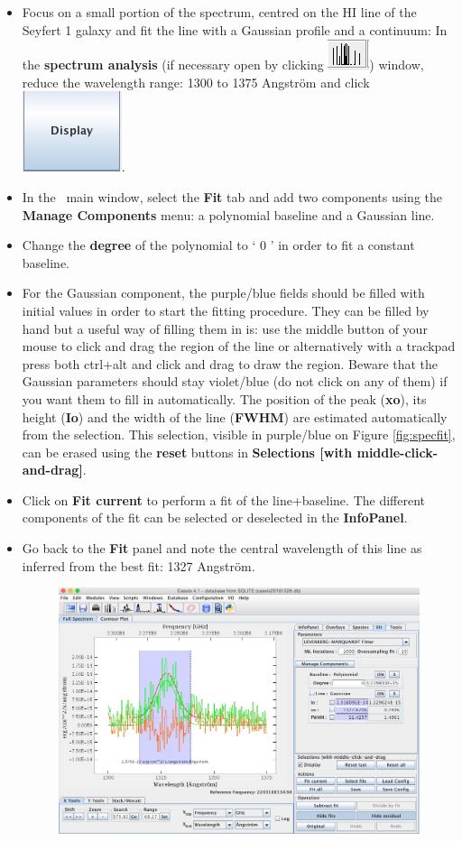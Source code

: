 \documentclass [a4paper, 12pt]{article}
\begin{document}
\begin{itemize}
\item Focus on a small portion of the spectrum, centred on the HI line of the
Seyfert 1 galaxy and fit the line with a Gaussian profile and a continuum: In
the \textbf{spectrum analysis} (if necessary open by clicking
\includegraphics[width=0.05
\textwidth]{../images/cassis_button_spec-analysis.jpg}) window, reduce the
wavelength range:
1300 to 1375 Angstr\"om and click \includegraphics[width=0.05
\textwidth]{../images/cassis_button_display.jpg}.
\item In the \cassis\ main window, select the \textbf{Fit} tab and add two
components using the \textbf{Manage Components} menu: a polynomial baseline and
a Gaussian line.
\item Change the \textbf{degree} of the polynomial to ` 0 ' in order to fit a constant baseline.
\item For the Gaussian component, the purple/blue fields should be filled with
initial values in order to start the fitting procedure. They can be filled by
hand but a useful way of filling them in is: use the middle button of your
mouse to click and drag the region of the line or alternatively with a trackpad
press both ctrl+alt and click and drag to draw the region. Beware that the
Gaussian parameters should stay violet/blue (do not click on any of them) if
you want them to fill in automatically. The position of the peak (\textbf{xo}),
its height (\textbf{Io}) and the width of the line (\textbf{FWHM}) are
estimated automatically from the selection. This selection, visible in
purple/blue on Figure \ref{fig:specfit}, can be erased using the \textbf{reset}
buttons in \textbf{Selections [with middle-click-and-drag]}.
\item Click on \textbf{Fit current} to perform a fit of the line+baseline. The different components of the fit can be selected or deselected in the \textbf{InfoPanel}.
\item Go back to the \textbf{Fit} panel and note the central wavelength of this line as inferred from the best fit: 1327 Angstr\"om.
\begin{figure}[H]
\center
\includegraphics[width=0.6  \textwidth]{../images/cassis_window_fit-spec.jpg}

\end{figure}
\end{itemize}
\end{document}
